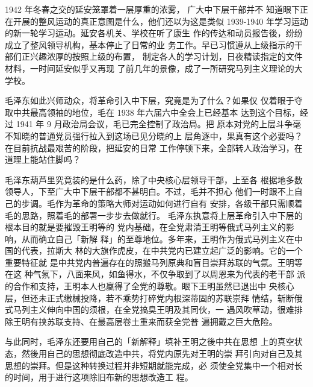 1942 年冬春之交的延安笼罩着一层厚重的浓雾，
广大中下层干部并不
知道眼下正在开展的整风运动的真正意图是什么，他们还以为这是类似
1939-1940 年学习运动的新一轮学习运动。延安各机关、学校在听了康生
作的传达和动员报告後，纷纷成立了整风领导机构，基本停止了日常的业
务工作。早已习惯遵从上级指示的干部们正兴趣浓厚的按照上级的布置，
制定各人的学习计划，日夜精读指定的文件材料，一时间延安似乎又再现
了前几年的景像，成了一所研究马列主义理论的大学校。

毛泽东如此兴师动众，将革命引入中下层，究竟是为了什么？如果仅
仅着眼于夺取中共最高领袖的地位，毛在 1938 年六届六中全会上已经基本
达到这个目标，经过 1941 年 9 月政治局会议，毛已完全控制了政治局。把
原本对党的上层斗争毫不知晓的普通党员强行拉入到这场已见分晓的上
层角逐中，果真有这个必要吗？在目前抗战最艰苦的阶段，把延安的日常
工作停顿下来，全部转人政治学习，在道理上能站住脚吗？

毛泽东葫芦里究竟装的是什么药，除了中央核心层领导干部，上至各
根据地多数领导人，下至广大中下层干部都不甚明白。不过，毛并不担心
他们一时跟不上自己的步调。毛作为革命的策略大师对运动如何进行自有
安排，各级干部只需顺着毛的思路，照着毛的部署一步步去做就行。
毛泽东执意将上层革命引入中下层的根本目的就是要摧毁王明等的
党内基础，在全党肃清王明等俄式马列主义的影响，从而确立自己「新解
释」的至尊地位。多年来，王明作为俄式马列主义在中国的代表，拉斯大
林的大旗作虎皮，在中共党内已建立起广泛的影响。它的一个重要特征就
是中共党内普遍存在的照搬马列原典和盲目崇拜苏联的气氛。王明等在这
种气氛下，八面来风，如鱼得水，不仅争取到了以周恩来为代表的老干部
派的合作和支持，王明本人也嬴得了全党的尊敬。眼下王明虽然已退出中
央核心层，但还未正式缴械投降，若不乘势打碎党内根深蒂固的苏联崇拜
情结，斩断俄式马列主义伸向中国的须根，在全党搞臭王明及其同伙，一
遇风吹草动，很难排除王明有挟苏联支持、在最高层卷土重来而获全党普
遍拥戴之巨大危险。

与此同时，毛泽东还要用自己的「新解释」填补王明之後中共在思想
上的真空状态，然後用自己的思想彻底改造中共，将党内原先对王明的崇
拜引向对自己及其思想的崇拜。但是这种转换过程并非短期就能完成，必
须使全党集中一个相对长的时间，用于进行这项除旧布新的思想改造工
程。

